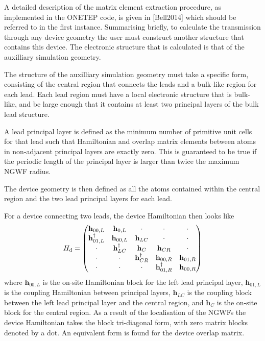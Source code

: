 \documentclass[letterpaper,10pt,english]{sphinxmanual}
\begin{document}
A detailed description of the matrix element extraction procedure, as
implemented in the ONETEP code, is given in {[}Bell2014{]}
which should be referred to in the first instance. Summarising briefly,
to calculate the transmission through any device geometry the user must
construct another  structure that contains this
device. The  electronic structure that is calculated is that of
the auxilliary simulation geometry.

The structure of the auxilliary simulation geometry must take a specific
form, consisting of the central region that connects the leads and a
bulk-like region for each lead. Each lead region must have a local
electronic structure that is bulk-like, and be large enough that it
contains at least two principal layers of the bulk lead structure. %
\begin{footnote}[1]\sphinxAtStartFootnote
A lead principal layer is defined as the minimum number of primitive
unit cells for that lead such that Hamiltonian and overlap matrix
elements between atoms in non-adjacent principal layers are exactly
zero. This is guaranteed to be true if the periodic length of the
principal layer is larger than twice the maximum NGWF radius.
%
\end{footnote}
The device geometry is then defined as all the atoms contained within
the central region and the two lead principal layers for each lead.

For a device connecting two leads, the device Hamiltonian then looks
like
\begin{equation*}
\begin{split}H_{\rm d} =
   \begin{pmatrix}
      \mathbf{h}_{00,L}    & \mathbf{h}_{0,L}  & \cdot                & \cdot                  & \cdot              \\
      \mathbf{h}^\dagger_{01,L} & \mathbf{h}_{00,L}  & \mathbf{h}_{LC}    & \cdot                  & \cdot              \\
      \cdot                  & \mathbf{h}^\dagger_{LC} & \mathbf{h}_{C}     & \mathbf{h}_{CR}      & \cdot              \\
      \cdot                  & \cdot                & \mathbf{h}^\dagger_{CR} & \mathbf{h}_{00,R}    & \mathbf{h}_{01,R}\\
      \cdot                  & \cdot                & \cdot                & \mathbf{h}^\dagger_{01,R} & \mathbf{h}_{00,R}
   \end{pmatrix}\end{split}
\end{equation*}
where \(\mathbf{h}_{00,L}\) is the on-site Hamiltonian block for
the left lead principal layer, \(\mathbf{h}_{01,L}\) is the
coupling Hamiltonian between principal layers, \(\mathbf{h}_{LC}\)
is the coupling block between the left lead principal layer and the
central region, and \(\mathbf{h}_{C}\) is the on-site block for
the central region. As a result of the localisation of the NGWFs the
device Hamiltonian takes the block tri-diagonal form, with zero matrix
blocks denoted by a dot. An equivalent form is found for the device
overlap matrix.
\end{document}
